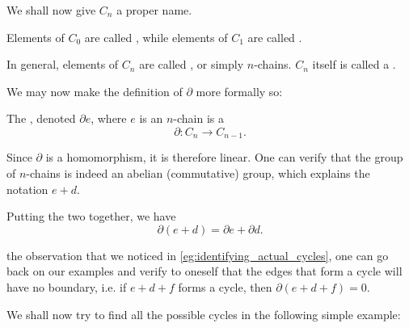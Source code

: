 \documentclass[notoc,notitlepage]{tufte-book}
\begin{document}
We shall now give $C_n$ a proper name.

\begin{defn}[$n$-Chain]\label{defn:n_chain}
  Elements of $C_0$ are called , while elements
  of $C_1$ are called .

  In general, elements of $C_n$ are called , or
  simply $n$-chains. $C_n$ itself is called a .
\end{defn}

We may now make the definition of $\partial$ more formally so:

\begin{defn}\label{defn:boundary_of_chains}
  The , denoted $\partial e$, where $e$ is an
  $n$-chain is a 
  \begin{equation*}
    \partial : C_n \to C_{n - 1}.
  \end{equation*}
\end{defn}

\begin{remark}
  Since $\partial$ is a homomorphism, it is therefore linear. One can verify
  that the group of $n$-chains is indeed an abelian (commutative) group, which
  explains the notation $e + d$.

  Putting the two together, we have
  \begin{equation*}
    \partial(e + d) = \partial e + \partial d.
  \end{equation*}
\end{remark}

 the observation that we noticed in
\cref{eg:identifying_actual_cycles}, one can go back on our examples and verify
to oneself that the edges that form a cycle will have no boundary, i.e. if $e +
d + f$ forms a cycle, then $\partial(e + d + f) = 0$.

We shall now try to find all the possible cycles in the following simple
example:
\end{document}
